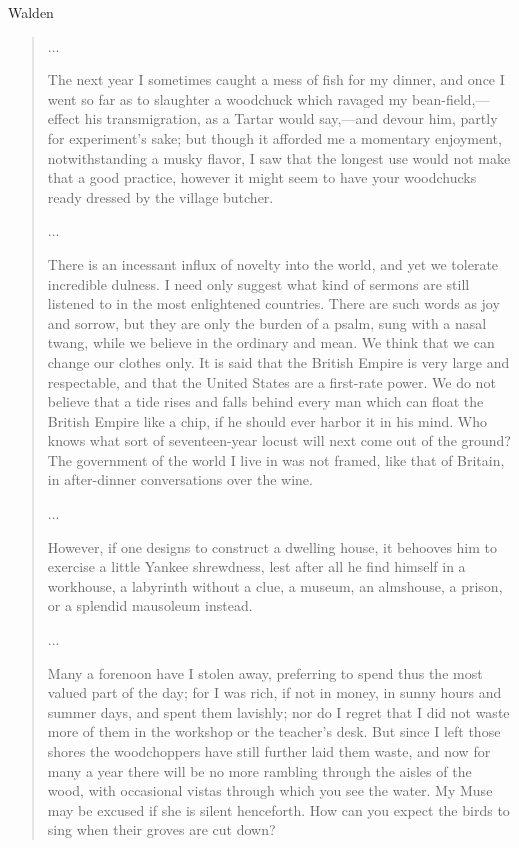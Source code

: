\begin{texts}{Walden}
\begin{quote}
    ...
    
    The next year I sometimes caught a mess of fish for my dinner, and once I went so far as to slaughter a woodchuck which ravaged my bean-field,—effect his transmigration, as a Tartar would say,—and devour him, partly for experiment's sake; but though it afforded me a momentary enjoyment, notwithstanding a musky flavor, I saw that the longest use would not make that a good practice, however it might seem to have your woodchucks ready dressed by the village butcher.
    
    ...
    
    There is an incessant influx of novelty into the world, and yet we tolerate incredible dulness. I need only suggest what kind of sermons are still listened to in the most enlightened countries. There are such words as joy and sorrow, but they are only the burden of a psalm, sung with a nasal twang, while we believe in the ordinary and mean. We think that we can change our clothes only. It is said that the British Empire is very large and respectable, and that the United States are a first-rate power. We do not believe that a tide rises and falls behind every man which can float the British Empire like a chip, if he should ever harbor it in his mind. Who knows what sort of seventeen-year locust will next come out of the ground? The government of the world I live in was not framed, like that of Britain, in after-dinner conversations over the wine.
    
    ...
    
    However, if one designs to construct a dwelling house, it behooves him to exercise a little Yankee shrewdness, lest after all he find himself in a workhouse, a labyrinth without a clue, a museum, an almshouse, a prison, or a splendid mausoleum instead.
    
    ...
    
    Many a forenoon have I stolen away, preferring to spend thus the most valued part of the day; for I was rich, if not in money, in sunny hours and summer days, and spent them lavishly; nor do I regret that I did not waste more of them in the workshop or the teacher's desk. But since I left those shores the woodchoppers have still further laid them waste, and now for many a year there will be no more rambling through the aisles of the wood, with occasional vistas through which you see the water. My Muse may be excused if she is silent henceforth. How can you expect the birds to sing when their groves are cut down?
\end{quote}


\end{texts}

